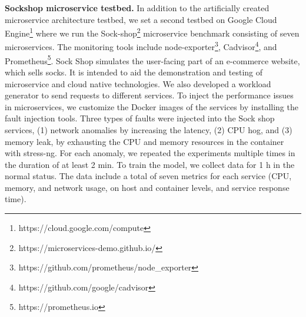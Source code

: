 \textbf{Sockshop microservice testbed.} In addition to the artificially created microservice architecture testbed, we set a second testbed on Google Cloud Engine\footnote{https://cloud.google.com/compute} where we run the Sock-shop\footnote{https://microservices-demo.github.io/} microservice benchmark consisting of seven microservices. The monitoring tools include node-exporter\footnote{https://github.com/prometheus/node\_exporter}, Cadvisor\footnote{https://github.com/google/cadvisor}, and Prometheus\footnote{https://prometheus.io}. Sock Shop simulates the user-facing part of an e-commerce website, which sells socks. It is intended to aid the demonstration and testing of microservice and cloud native technologies. We also developed a workload generator to send requests to different services. To inject the performance issues in microservices, we customize the Docker images of the services by installing the fault injection tools. Three types of faults were injected into the Sock shop services, (1) network anomalies by increasing the latency, (2) CPU hog, and (3) memory leak, by exhausting the CPU and memory resources in the container with stress-ng. For each anomaly, we repeated the experiments multiple times in the duration of at least 2 min. To train the model, we collect data for 1 h in the normal status. The data include a total of seven metrics for each service (CPU, memory, and network usage, on host and container levels, and service response time).





